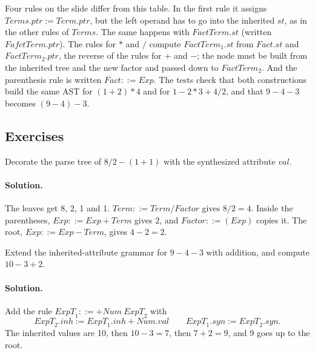 Four rules on the slide differ from this table. In the first rule it assigns
$\mathit{Terms}.\mathit{ptr} := \mathit{Term}.\mathit{ptr}$, but the left operand has to go
into the inherited $\mathit{st}$, as in the other rules of $\mathit{Terms}$. The same
happens with $\mathit{FactTerm}.\mathit{st}$ (written $\mathit{FafctTerm}.\mathit{ptr}$). The rules
for $*$ and $/$ compute $\mathit{FactTerm}_1.\mathit{st}$ from $\mathit{Fact}.\mathit{st}$ and
$\mathit{FactTerm}_2.\mathit{ptr}$, the reverse of the rules for $+$ and $-$; the node
must be built from the inherited tree and the new factor and passed down to
$\mathit{FactTerm}_2$. And the parenthesis rule is written $\mathit{Fact} ::= \mathit{Exp}$.
The tests check that both constructions build the same AST for $(1+2)*4$ and
for $1-2*3+4/2$, and that $9-4-3$ becomes $(9-4)-3$.

\subsection{Exercises}

\begin{exercise}
Decorate the parse tree of $8 / 2 - (1 + 1)$ with the synthesized attribute
$\mathit{val}$.
\end{exercise}

\paragraph{Solution.} The leaves get 8, 2, 1 and 1. $\mathit{Term} ::= \mathit{Term} / \mathit{Factor}$
gives $8 / 2 = 4$. Inside the parentheses, $\mathit{Exp} ::= \mathit{Exp} + \mathit{Term}$ gives
$2$, and $\mathit{Factor} ::= (\mathit{Exp})$ copies it. The root,
$\mathit{Exp} ::= \mathit{Exp} - \mathit{Term}$, gives $4 - 2 = 2$.

\begin{exercise}
Extend the inherited-attribute grammar for $9-4-3$ with addition, and compute
$10 - 3 + 2$.
\end{exercise}

\paragraph{Solution.} Add the rule $\mathit{ExpT}_1 ::= + \mathit{Num}\ \mathit{ExpT}_2$ with
\[
\mathit{ExpT}_2.\mathit{inh} := \mathit{ExpT}_1.\mathit{inh} + \mathit{Num}.\mathit{val}
\qquad
\mathit{ExpT}_1.\mathit{syn} := \mathit{ExpT}_2.\mathit{syn}.
\]
The inherited values are 10, then
$10 - 3 = 7$, then $7 + 2 = 9$, and 9 goes up to the root.

